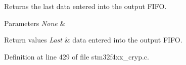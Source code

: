 Returns the last data entered into the output F\-I\-F\-O. 


\begin{DoxyParams}{Parameters}
{\em None} & \\
\hline
\end{DoxyParams}

\begin{DoxyRetVals}{Return values}
{\em Last} & data entered into the output F\-I\-F\-O. \\
\hline
\end{DoxyRetVals}


Definition at line 429 of file stm32f4xx\-\_\-cryp.\-c.

